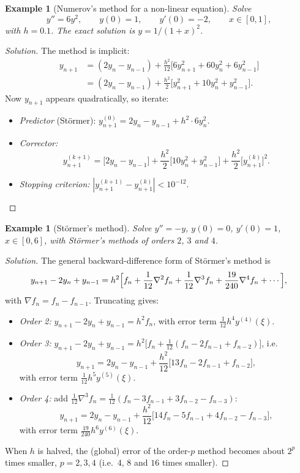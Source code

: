 \documentclass[11pt,a4paper]{article}
\numberwithin{equation}{section}
\theoremstyle{spacedplain}
\theoremstyle{spaceddefinition}
\newtheorem{example}[theorem]{Example}
\theoremstyle{spacedremark}
\begin{document}
\begin{example}[Numerov's method for a non-linear equation]
Solve
\[
  y''=6y^2,\qquad y(0)=1,\qquad y'(0)=-2,\qquad x\in[0,1],
\]
with \(h=0.1\).  The exact solution is \(y=1/(1+x)^2\).
\end{example}

\begin{proof}[Solution]
The method is implicit:
\begin{align*}
  y_{n+1}
  &=(2y_n-y_{n-1})+\frac{h^2}{12}\bigl[6y_{n+1}^2+60y_n^2+6y_{n-1}^2\bigr]\\
  &=(2y_n-y_{n-1})+\frac{h^2}{2}\bigl[y_{n+1}^2+10y_n^2+y_{n-1}^2\bigr].
\end{align*}
Now \(y_{n+1}\) appears quadratically, so iterate:
\begin{itemize}
  \item \emph{Predictor} (Störmer):
    \(y_{n+1}^{(0)}=2y_n-y_{n-1}+h^2\cdot6y_n^2\).
  \item \emph{Corrector:}
    \[
      y_{n+1}^{(k+1)}
      =\bigl[2y_n-y_{n-1}\bigr]
       +\frac{h^2}2\bigl[10y_n^2+y_{n-1}^2\bigr]
       +\frac{h^2}2\bigl[y_{n+1}^{(k)}\bigr]^2 .
    \]
  \item \emph{Stopping criterion:}
    \(|y_{n+1}^{(k+1)}-y_{n+1}^{(k)}|<10^{-12}\).
\end{itemize}
\end{proof}

\begin{example}[Störmer's method]
Solve \(y''=-y\), \(y(0)=0\), \(y'(0)=1\), \(x\in[0,6]\), with
Störmer's methods of orders \(2\), \(3\) and \(4\).
\end{example}

\begin{proof}[Solution]
The general backward-difference form of Störmer's method is
\[
  y_{n+1}-2y_n+y_{n-1}
  =h^2\Bigl[f_n+\frac1{12}\nabla^2f_n+\frac1{12}\nabla^3f_n
            +\frac{19}{240}\nabla^4f_n+\cdots\Bigr],
\]
with \(\nabla f_n=f_n-f_{n-1}\).  Truncating gives:
\begin{itemize}
  \item \emph{Order 2:} \(y_{n+1}-2y_n+y_{n-1}=h^2f_n\), with error
    term \(\frac1{12}h^4y^{(4)}(\xi)\).
  \item \emph{Order 3:}
    \(y_{n+1}-2y_n+y_{n-1}
      =h^2\bigl[f_n+\frac1{12}(f_n-2f_{n-1}+f_{n-2})\bigr]\), i.e.
    \[
      y_{n+1}=2y_n-y_{n-1}+\frac{h^2}{12}\bigl[13f_n-2f_{n-1}+f_{n-2}\bigr],
    \]
    with error term \(\frac1{12}h^5y^{(5)}(\xi)\).
  \item \emph{Order 4:} add
    \(\frac1{12}\nabla^3f_n=\frac1{12}(f_n-3f_{n-1}+3f_{n-2}-f_{n-3})\):
    \[
      y_{n+1}=2y_n-y_{n-1}
      +\frac{h^2}{12}\bigl[14f_n-5f_{n-1}+4f_{n-2}-f_{n-3}\bigr],
    \]
    with error term \(\frac{19}{240}h^6y^{(6)}(\xi)\).
\end{itemize}
When \(h\) is halved, the (global) error of the order-\(p\) method
becomes about \(2^p\) times smaller, \(p=2,3,4\) (i.e.\ \(4\), \(8\) and
\(16\) times smaller).
\end{proof}
\end{document}

